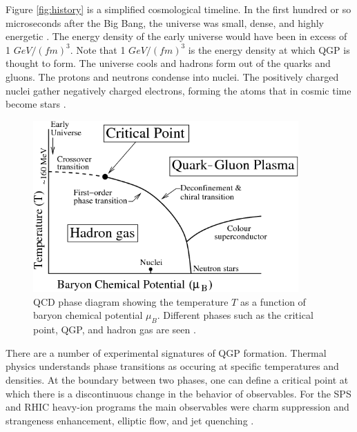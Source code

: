 Figure \ref{fig:history} is a simplified cosmological timeline. In the first hundred or so microseconds after the Big Bang, the universe was small, dense, and highly energetic \cite{Bandyopadhyay:2017wip}. The energy density of the early universe would have been in excess of 1 $GeV/(fm)^3$. Note that 1 $GeV/(fm)^3$ is the energy density at which QGP is thought to form. The universe cools and hadrons form out of the quarks and gluons. The protons and neutrons condense into nuclei. The positively charged nuclei gather negatively charged electrons, forming the atoms that in cosmic time become stars \cite{Witten:1984rs}.

\begin{figure}[h!]
\begin{centering}
\includegraphics[width=4in]{Chapter1/importfigs/byr13.png}
\par\end{centering}
\caption{QCD phase diagram showing the temperature $T$ as a function of baryon chemical potential $\mu_B$. Different phases such as the critical point, QGP, and hadron gas are seen \cite{Bhalerao:1695331}. \label{fig:QCDPhase}}
\end{figure}

There are a number of experimental signatures of QGP formation. Thermal physics understands phase transitions as occuring at specific temperatures and densities. At the boundary between two phases, one can define a critical point at which there is a discontinuous change in the behavior of observables. For the SPS and RHIC heavy-ion programs the main observables were charm suppression and strangeness enhancement, elliptic flow, and jet quenching \cite{Gyulassy:1990ye,Matsui:1986dk,Margetis:2000sv}.

